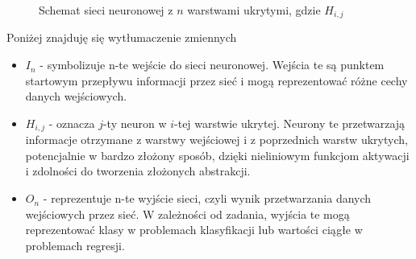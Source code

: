 \begin{enumerate}
\begin{figure}[htbp]
\caption{Schemat sieci neuronowej z \(n\) warstwami ukrytymi, gdzie $H_{i,j}$ }
\end{figure}

Poniżej znajduję się wytłumaczenie zmiennych
\begin{itemize}
    \item \(I_n\) - symbolizuje n-te wejście do sieci neuronowej. Wejścia te są punktem startowym przepływu informacji przez sieć i mogą reprezentować różne cechy danych wejściowych.
    \item \(H_{i,j}\) - oznacza $j$-ty neuron w $i$-tej warstwie ukrytej. Neurony te przetwarzają informacje otrzymane z warstwy wejściowej i z poprzednich warstw ukrytych, potencjalnie w bardzo złożony sposób, dzięki nieliniowym funkcjom aktywacji i zdolności do tworzenia złożonych abstrakcji.
    \item \(O_n\) - reprezentuje n-te wyjście sieci, czyli wynik przetwarzania danych wejściowych przez sieć. W zależności od zadania, wyjścia te mogą reprezentować klasy w problemach klasyfikacji lub wartości ciągłe w problemach regresji.
\end{itemize}


\end{enumerate}
